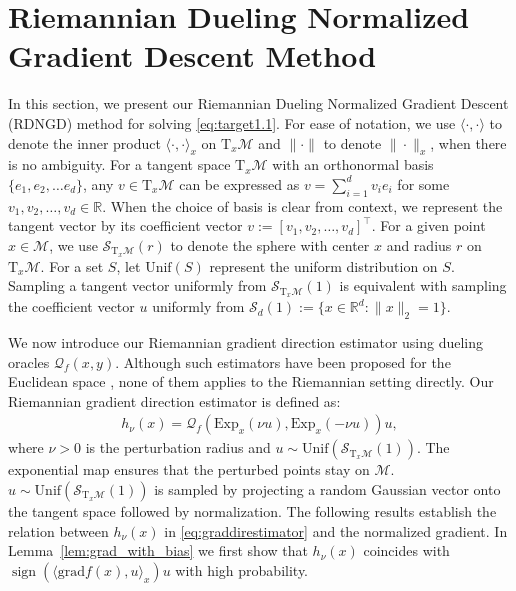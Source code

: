 \documentclass{article}
\newcommand{\rgrad}{\mathrm{grad}}
\newcommand{\pert}{\nu}
\theoremstyle{plain}
\theoremstyle{definition}
\theoremstyle{remark}
\begin{document}
\section{Riemannian Dueling Normalized Gradient Descent Method}\label{sec:section3}
In this section, we present our Riemannian Dueling Normalized Gradient Descent (RDNGD) method for solving \eqref{eq:target1.1}. For ease of notation, we use $\langle\cdot,\cdot\rangle$ to denote the inner product $\langle\cdot,\cdot\rangle_x$ on $\mathrm{T}_x\mathcal{M}$ and $\|\cdot\|$ to denote $\|\cdot\|_x$, when there is no ambiguity. For a tangent space $\mathrm{T}_x\mathcal{M}$ with an orthonormal basis $\{e_1,e_2,\ldots e_d\}$, any $v\in \mathrm{T}_x\mathcal{M}$ can be expressed as $v=\sum_{i=1}^d v_i e_i$ for some $v_1,v_2,\ldots,v_d\in\mathbb{R}$. When the choice of basis is clear from context, we represent the tangent vector by its coefficient vector $ v := [v_1, v_2, \ldots, v_d]^\top$.
For a given point $x\in\mathcal{M}$, we use $\mathcal{S}_{\mathrm{T}_x\mathcal{M}}(r)$ to denote the sphere with center $x$ and radius $r$ on $\mathrm{T}_x\mathcal{M}$. For a set $S$, let $\mathrm{Unif}(S)$ represent the uniform distribution on $S$. Sampling a tangent vector uniformly from $\mathcal{S}_{\mathrm{T}_x\mathcal{M}}(1)$ is equivalent with sampling the coefficient vector $u$ uniformly from $\mathcal{S}_d(1):=\{x\in \mathbb{R}^d:\|x\|_2=1\}$. 

We now introduce our Riemannian gradient direction estimator using dueling oracles $\mathcal{Q}_f(x,y)$. Although such estimators have been proposed for the Euclidean space \cite{zhang2024comparisons,pmlr-v139-saha21b}, none of them applies to the Riemannian setting directly. 
Our Riemannian gradient direction estimator is defined as:
\begin{align}\label{eq:graddirestimator}
h_\pert(x)=\mathcal{Q}_f(\mathrm{Exp}_x(\pert u), \mathrm{Exp}_x( -\pert u))u,
\end{align}
where $\pert>0$ is the perturbation radius and $u\sim \mathrm{Unif}(\mathcal{S}_{\mathrm{T}_x\mathcal{M}}(1))$. The exponential map ensures that the perturbed points stay on $\mathcal{M}$. 
$u\sim \mathrm{Unif}(\mathcal{S}_{\mathrm{T}_x\mathcal{M}}(1))$ is sampled by projecting a random Gaussian vector onto the tangent space  followed by normalization. 
The following results establish the relation between $h_\nu(x)$ in \eqref{eq:graddirestimator} and the normalized gradient. In Lemma~\ref{lem:grad_with_bias} we first show that $h_\pert(x)$ coincides with $\operatorname{sign}(\langle \rgrad f(x),u\rangle_x)u$  with high probability.
\end{document}
